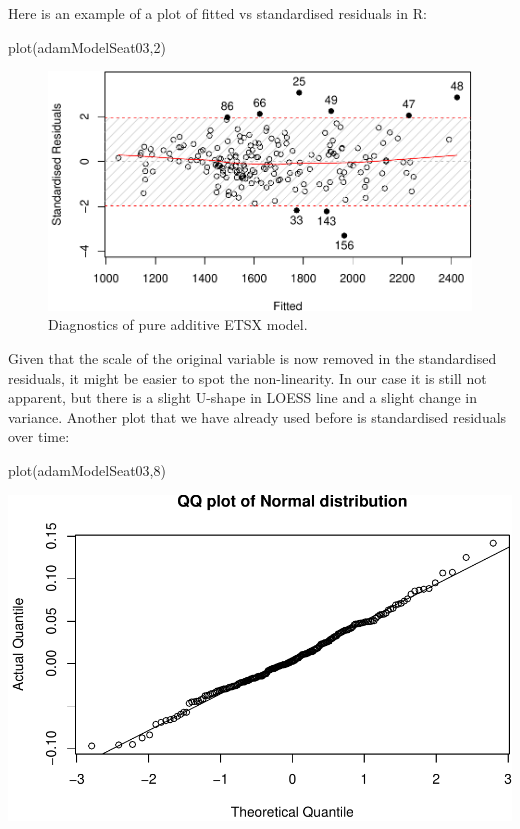 \documentclass[
]{book}
\newenvironment{Shaded}{\begin{snugshade}}{\end{snugshade}}
\newcommand{\DecValTok}[1]{\textcolor[rgb]{0.00,0.00,0.81}{#1}}
\newcommand{\FunctionTok}[1]{\textcolor[rgb]{0.00,0.00,0.00}{#1}}
\newcommand{\NormalTok}[1]{#1}
\theoremstyle{definition}
\theoremstyle{definition}
\theoremstyle{definition}
\theoremstyle{definition}
\theoremstyle{remark}
\begin{document}
Here is an example of a plot of fitted vs standardised residuals in R:

\begin{Shaded}
\begin{Highlighting}[]
\FunctionTok{plot}\NormalTok{(adamModelSeat03,}\DecValTok{2}\NormalTok{)}
\end{Highlighting}
\end{Shaded}

\begin{figure}
\centering
\includegraphics{adam_files/figure-latex/adamModelSeat03Resid-1.pdf}
\caption{\label{fig:adamModelSeat03Resid}Diagnostics of pure additive ETSX model.}
\end{figure}

Given that the scale of the original variable is now removed in the standardised residuals, it might be easier to spot the non-linearity. In our case it is still not apparent, but there is a slight U-shape in LOESS line and a slight change in variance. Another plot that we have already used before is standardised residuals over time:

\begin{Shaded}
\begin{Highlighting}[]
\FunctionTok{plot}\NormalTok{(adamModelSeat03,}\DecValTok{8}\NormalTok{)}
\end{Highlighting}
\end{Shaded}

\includegraphics{adam_files/figure-latex/unnamed-chunk-132-1.pdf}
\end{document}
